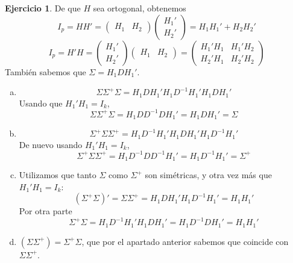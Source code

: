 \documentclass[12pt,spanish]{article}
\theoremstyle{definition}
\newtheorem{exercise}{Ejercicio}
\begin{document}
\begin{exercise} %
  De que $H$ sea ortogonal, obtenemos
  \[I_p=HH'=
    \begin{pmatrix}
      H_1 & H_2
    \end{pmatrix}
    \begin{pmatrix}
      H_1' \\ H_2'
    \end{pmatrix}=H_1H_1'+H_2H_2'
  \]
  \[I_p=H'H=
    \begin{pmatrix}
      H_1' \\ H_2'
    \end{pmatrix}
    \begin{pmatrix}
      H_1 & H_2
    \end{pmatrix}=
    \begin{pmatrix}
      H_1'H_1 & H_1'H_2 \\ H_2'H_1 & H_2'H_2
    \end{pmatrix}
  \]
  También sabemos que $\Sigma=H_1DH_1'$.
  \begin{enumerate}[a)]
  \item \[\Sigma\Sigma^+\Sigma=H_1DH_1'H_1D^{-1}H_1'H_1DH_1'\]
    Usando que $H_1'H_1=I_k$,
    \[\Sigma\Sigma^+\Sigma=H_1DD^{-1}DH_1'=H_1DH_1'=\Sigma\]
  \item \[\Sigma^+\Sigma\Sigma^+=H_1D^{-1}H_1'H_1DH_1'H_1D^{-1}H_1'\]
    De nuevo usando $H_1'H_1=I_k$,
    \[\Sigma^+\Sigma\Sigma^+=H_1D^{-1}DD^{-1}H_1'=H_1D^{-1}H_1'=\Sigma^+\]
  \item Utilizamos que tanto $\Sigma$ como $\Sigma^+$ son
    simétricas, y otra vez más que $H_1'H_1=I_k$:
    \[(\Sigma^+\Sigma)'=\Sigma\Sigma^+=H_1DH_1'H_1D^{-1}H_1'=H_1H_1'\]
    Por otra parte
    \[\Sigma^+\Sigma=H_1D^{-1}H_1'H_1DH_1'=H_1D^{-1}DH_1'=H_1H_1'\]
  \item $(\Sigma\Sigma^+)=\Sigma^+\Sigma$, que por el apartado
    anterior sabemos que coincide con $\Sigma\Sigma^+$.
  \end{enumerate}
\end{exercise}
\end{document}
